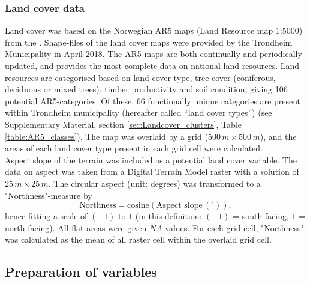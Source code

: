 \documentclass{article}
\begin{document}
\subsubsection{Land cover data}
Land cover was based on the Norwegian AR5 maps (Land Resource map 1:5000) from the \cite{AR5}. 
Shape-files of the land cover maps were provided by the Trondheim Municipality in April 2018. The AR5 maps are both continually and periodically updated, and provides the most complete data on national land resources. %
Land resources are categorised based on land cover type, tree cover (coniferous, deciduous or mixed trees), timber productivity and soil condition, giving 106 potential AR5-categories. Of these, 66 functionally unique categories are present within Trondheim municipality (hereafter called ``land cover types'') (see Supplementary Material, section \ref{sec:Landcover_clusters}, Table \ref{table:AR5_classes}).
The map was overlaid by a grid ($500\,m \times 500\,m$), and the areas of each land cover type present in each grid cell were calculated.\\

Aspect slope of the terrain was included as a potential land cover variable.  The data on aspect was taken from a Digital Terrain Model raster with a solution of $25\,m \times 25\,m$. The circular aspect (unit: degrees) was transformed to a "Northness"-measure by
\begin{equation*}
\text{Northness} =\text{cosine}(\text{Aspect slope}\,(^\circ)),
\end{equation*}
hence fitting a scale of $(-1)$ to $1$ (in this definition: $(-1)$ = south-facing, $1$ = north-facing). All flat areas were given $NA$-values. For each grid cell, "Northness" was calculated as the mean of all raster cell within the overlaid grid cell. 

\subsection{Preparation of variables}
\end{document}

